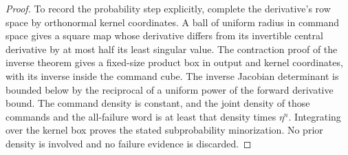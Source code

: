\documentclass[11pt]{amsart}
\theoremstyle{definition}\newtheorem{definition}[theorem]{Definition}
\theoremstyle{remark}\newtheorem{remark}[theorem]{Remark}
\begin{document}
\begin{proof}
To record the probability step explicitly, complete the derivative's row
space by orthonormal kernel coordinates. A ball of uniform radius in
command space gives a square map whose derivative differs from its
invertible central derivative by at most half its least singular value.
The contraction proof of the inverse theorem gives a fixed-size product
box in output and kernel coordinates, with its inverse inside the command
cube. The inverse Jacobian determinant is bounded below by the reciprocal
of a uniform power of the forward derivative bound. The command density
is constant, and the joint density of those commands and the all-failure
word is at least that density times $\eta^n$. Integrating over the
kernel box proves the stated subprobability minorization. No prior
density is involved and no failure evidence is discarded.
\end{proof}
\end{document}
